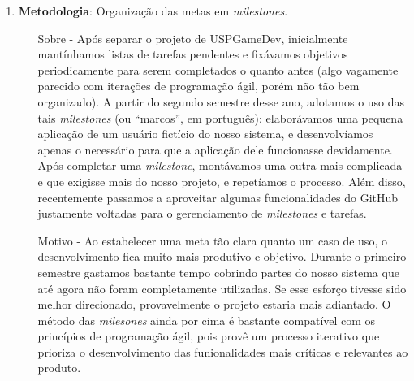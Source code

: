 \begin{enumerate}
    \item \textbf{Metodologia}: Organização das metas em \textit{milestones}.
      \begin{itemize}
        \item[Sobre -] Após separar o projeto de USPGameDev, inicialmente
          mantínhamos listas de tarefas pendentes e fixávamos objetivos
          periodicamente para serem completados o quanto antes (algo vagamente
          parecido com iterações de programação ágil, porém não tão bem
          organizado). A partir do segundo semestre desse ano, adotamos o
          uso das tais \textit{milestones} (ou ``marcos'', em português):
          elaborávamos uma pequena aplicação de um usuário fictício do nosso
          sistema, e desenvolvíamos apenas o necessário para que a aplicação
          dele funcionasse devidamente. Após completar uma \textit{milestone},
          montávamos uma outra mais complicada e que exigisse mais do nosso
          projeto, e repetíamos o processo. Além disso, recentemente passamos
          a aproveitar algumas funcionalidades do GitHub justamente voltadas
          para o gerenciamento de \textit{milestones} e tarefas.
        \item[Motivo -] Ao estabelecer uma meta tão clara quanto um caso de uso,
          o desenvolvimento fica muito mais produtivo e objetivo. Durante o
          primeiro semestre gastamos bastante tempo cobrindo partes do nosso
          sistema que até agora não foram completamente utilizadas. Se esse
          esforço tivesse sido melhor direcionado, provavelmente o projeto estaria
          mais adiantado. O método das \textit{milesones} ainda por cima é
          bastante compatível com os princípios de programação ágil, pois provê
          um processo iterativo que prioriza o desenvolvimento das funionalidades
          mais críticas e relevantes ao produto.
      \end{itemize}


\end{enumerate}
